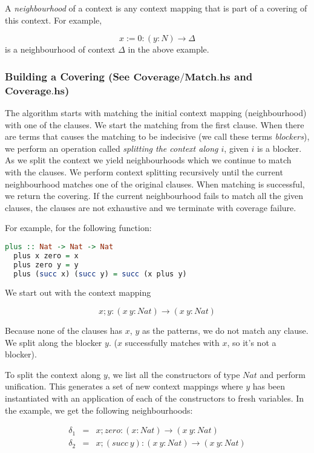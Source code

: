 A \textit{neighbourhood} of a context is any context mapping that is part of a covering of this context. For example, 

\[
  {x := 0} : (y : N) \to \Delta
\] is a neighbourhood of context $\Delta$ in the above example.

\subsubsection{Building a Covering (See $\boldsymbol{Coverage/Match.hs}$ and $\boldsymbol{Coverage.hs}$)} 

The algorithm starts with matching the initial context mapping (neighbourhood) with one of the clauses. We start the matching from the first clause. When there are terms that causes the matching to be indecisive (we call these terms \textit{blockers}), we perform an operation called \textit{splitting the context along $i$}, given $i$ is a blocker. As we split the context we yield neighbourhoods which we continue to match with the clauses. We perform context splitting recursively until the current neighbourhood matches one of the original clauses. When matching is successful, we return the covering. If the current neighbourhood fails to match all the given clauses, the clauses are not exhaustive and we terminate with coverage failure.

For example, for the following function:

\begin{lstlisting}[language=haskell]
  plus :: Nat -> Nat -> Nat
  plus x zero = x
  plus zero y = y
  plus (succ x) (succ y) = succ (x plus y)
\end{lstlisting}

We start out with the context mapping

\[
  x; y : (x \ y : Nat) \to (x \ y : Nat)
\]

Because none of the clauses has $x$, $y$ as the patterns, we do not match any clause. We split along the blocker $y$. ($x$ successfully matches with $x$, so it's not a blocker). 
 
To split the context along $y$, we list all the constructors of type $Nat$ and perform unification. This generates a set of new context mappings where $y$ has been instantiated with an application of each of the constructors to fresh variables. In the example, we get the following neighbourhoods:

\begin{figure}[H]
  \begin{equation*}
    \begin{aligned}
      \delta_1 & = & x; zero : (x : Nat) \to (x \ y : Nat) \\
      \delta_2 & = & x; (succ \ y) : (x \ y : Nat) \to (x \ y : Nat) \\
    \end{aligned}
  \end{equation*}
\end{figure}

